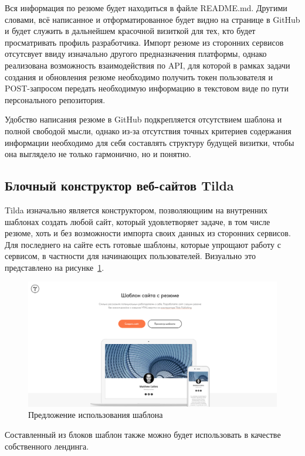 \documentclass[master, och, diploma]{SCWorks}
\begin{document}
Вся информация по резюме будет находиться в файле README.md. Другими словами, всё написанное и отформатированное будет видно на странице в GitHub и будет служить в дальнейшем красочной визиткой для тех, кто будет просматривать профиль разработчика\cite{gh_cv}. Импорт резюме из сторонних сервисов отсутсвует ввиду изначально другого предназначения платформы, однако реализована возможность взаимодействия по API, для которой в рамках задачи создания и обновления резюме необходимо получить токен пользователя и POST-запросом передать необходимую информацию в текстовом виде по пути персонального репозитория.

Удобство написания резюме в GitHub подкрепляется отсутствием шаблона и полной свободой мысли, однако из-за отсутствия точных критериев содержания информации необходимо для себя составлять структуру будущей визитки, чтобы она выглядело не только гармонично, но и понятно.



\subsection{Блочный конструктор веб-сайтов Tilda}
Tilda изначально является конструктором, позволяющиим на внутренних шаблонах создать любой сайт, который удовлетворяет задаче, в том числе резюме, хоть и без возможности импорта своих данных из сторонних сервисов. Для последнего на сайте есть готовые шаблоны, которые упрощают работу с сервисом, в частности для начинающих пользователей\cite{tilda_template}. Визуально это представлено на рисунке~\ref{fig:13}.
\begin{figure}[!ht]
    \centering
    \includegraphics[width=12cm]{images/image7.png}
    \caption{\label{fig:13}%
        Предложение использования шаблона}
\end{figure}

Составленный из блоков шаблон также можно будет использовать в качестве собственного лендинга. 
\end{document}
